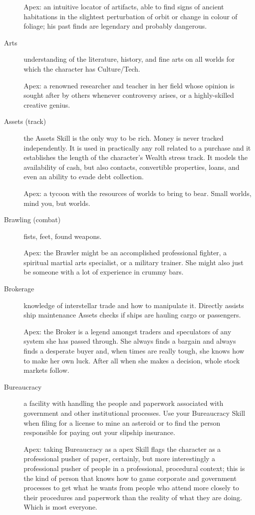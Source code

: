 \begin{description}
Apex: an intuitive locator of artifacts, able to find signs of ancient habitations in the slightest perturbation of orbit or change in colour of foliage; his past finds are legendary and probably dangerous.

\item[Arts]
understanding of the literature, history, and fine arts on all worlds for which the character has Culture/Tech.

Apex: a renowned researcher and teacher in her field whose opinion is sought after by others whenever controversy arises, or a highly-skilled creative genius.

\item[Assets (track)]
the Assets Skill is the only way to be rich. Money is never tracked independently. It is used in practically any roll related to a purchase and it establishes the length of the character's Wealth stress track. It models the availability of cash, but also contacts, convertible properties, loans, and even an ability to evade debt collection.

Apex: a tycoon with the resources of worlds to bring to bear. Small worlds, mind you, but worlds.

\item[Brawling (combat)]
fists, feet, found weapons.

Apex: the Brawler might be an accomplished professional fighter, a spiritual martial arts specialist, or a military trainer. She might also just be someone with a lot of experience in crummy bars.

\item[Brokerage]
knowledge of interstellar trade and how to manipulate it. Directly assists ship maintenance Assets checks if ships are hauling cargo or passengers.

Apex: the Broker is a legend amongst traders and speculators of any system she has passed through. She always finds a bargain and always finds a desperate buyer and, when times are really tough, she knows how to make her own luck. After all when she makes a decision, whole stock markets follow.

\item[Bureaucracy]
a facility with handling the people and paperwork associated with government and other institutional processes. Use your Bureaucracy Skill when filing for a license to mine an asteroid or to find the person responsible for paying out your slipship insurance.

Apex: taking Bureaucracy as a apex Skill flags the character as a professional pusher of paper, certainly, but more interestingly a professional pusher of people in a professional, procedural context; this is the kind of person that knows how to game corporate and government processes to get what he wants from people who attend more closely to their procedures and paperwork than the reality of what they are doing. Which is most everyone.


\end{description}
